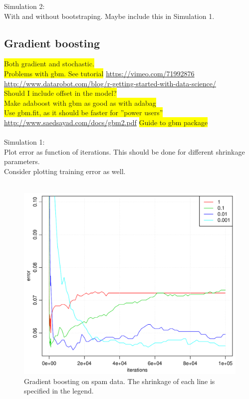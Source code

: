 Simulation 2: \\
With and without bootstraping. Maybe include this in Simulation 1.

\subsection{Gradient boosting}
\label{sub:SimGradBoost}
\colorbox{yellow}{Both gradient and stochastic.}\\
\colorbox{yellow}{Problems with gbm. See tutorial}
\url{https://vimeo.com/71992876} \\
\url{http://www.datarobot.com/blog/r-getting-started-with-data-science/}
\\ \colorbox{yellow}{Should I include offset in the model?}
\\ \colorbox{yellow}{Make adaboost with gbm as good as with adabag}
\\ \colorbox{yellow}{Use gbm.fit, as it should be faster for ''power users''} \\
\url{http://www.saedsayad.com/docs/gbm2.pdf} \colorbox{yellow}{Guide to gbm package}\\
\\
Simulation 1:\\
Plot error as function of iterations. This should be done for different shrinkage parameters.\\
Consider plotting training error as well.\\
\\
\begin{figure}[h!]
\begin{center}
    \includegraphics[scale=0.5]{./figures/gradboostSpamShrink2.pdf}
\end{center}
\caption{Gradient boosting on spam data. The shrinkage of each line is specified in the legend.}
\label{fig:gradboostSpamShrink2}
\end{figure}

